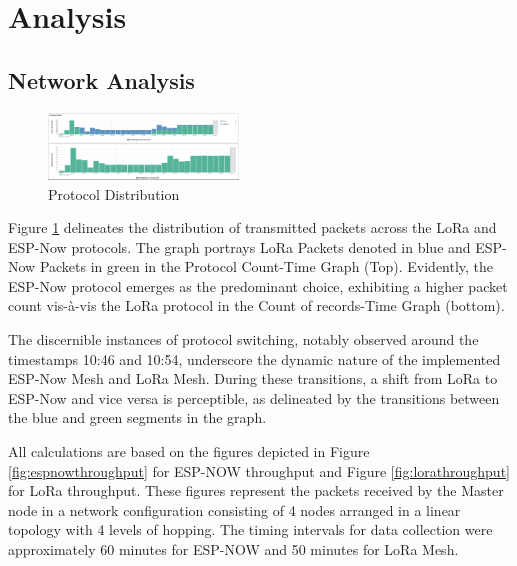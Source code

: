 \section{Analysis}\label{sec:analysis}

\subsection{Network Analysis}\label{sec:network_analysis}
\begin{figure}[H]
  \begin{center}
    \includegraphics[width=0.45\textwidth]{./Figures/elk/protocol_count.png}
  \end{center}
  \caption{Protocol Distribution}\label{fig:protocol_distribution}
\end{figure}

Figure \ref{fig:protocol_distribution} delineates the distribution of transmitted packets across the LoRa and ESP-Now protocols. The graph portrays LoRa Packets denoted in blue and ESP-Now Packets in green in the Protocol Count-Time Graph (Top). Evidently, the ESP-Now protocol emerges as the predominant choice, exhibiting a higher packet count vis-à-vis the LoRa protocol in the Count of records-Time Graph (bottom).

The discernible instances of protocol switching, notably observed around the timestamps 10:46 and 10:54, underscore the dynamic nature of the implemented ESP-Now Mesh and LoRa Mesh. During these transitions, a shift from LoRa to ESP-Now and vice versa is perceptible, as delineated by the transitions between the blue and green segments in the graph.

All calculations are based on the figures depicted in Figure \ref{fig:espnowthroughput} for ESP-NOW throughput and Figure \ref{fig:lorathroughput} for LoRa throughput. These figures represent the packets received by the Master node in a network configuration consisting of 4 nodes arranged in a linear topology with 4 levels of hopping. The timing intervals for data collection were approximately 60 minutes for ESP-NOW and 50 minutes for LoRa Mesh.

